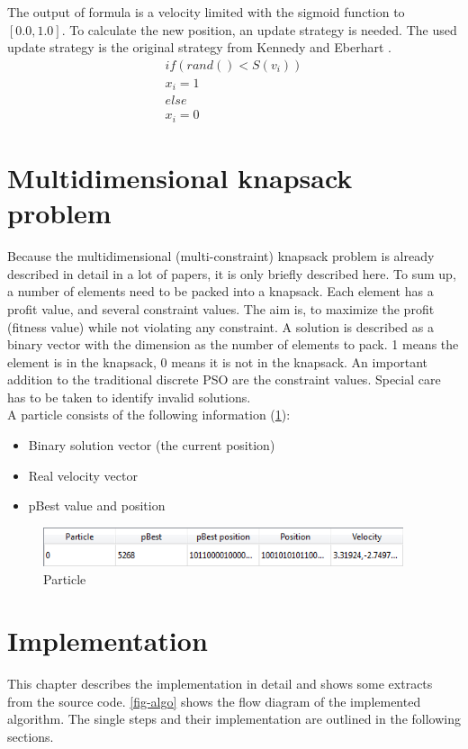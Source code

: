 \documentclass{article}
\begin{document}
The output of formula is a velocity limited with the sigmoid function to $[0.0, 1.0]$. To calculate the new position, an update strategy is needed. The used update strategy is the original strategy from Kennedy and Eberhart \cite{bib-discrete}.
\begin{multline}
\label{formula-4}
if (rand() < S(v_i))\\
	x_i = 1\\
else\\
	x_i = 0
\end{multline}

\section{Multidimensional knapsack problem}
\label{lbl-mknap}
Because the multidimensional (multi-constraint) knapsack problem is already described in detail in a lot of papers, it is only briefly described here. To sum up, a number of elements need to be packed into a knapsack. Each element has a profit value, and several constraint values. The aim is, to maximize the profit (fitness value) while not violating any constraint. A solution is described as a binary vector with the dimension as the number of elements to pack. 1 means the element is in the knapsack, 0 means it is not in the knapsack. An important addition to the traditional discrete PSO are the constraint values. Special care has to be taken to identify invalid solutions.\\

A particle consists of the following information (\ref{fig-particle}):
\begin{itemize}
\item Binary solution vector (the current position)
\item Real velocity vector
\item pBest value and position
\end{itemize}

\begin{figure}[H]
    \centering
    \includegraphics[width=400px]{images/particle.PNG}
    \caption{Particle}
    \label{fig-particle}
\end{figure}

\section{Implementation}
\label{lbl-impl}
This chapter describes the implementation in detail and shows some extracts from the source code. \ref{fig-algo} shows the flow diagram of the implemented algorithm. The single steps and their implementation are outlined in the following sections.
\end{document}
